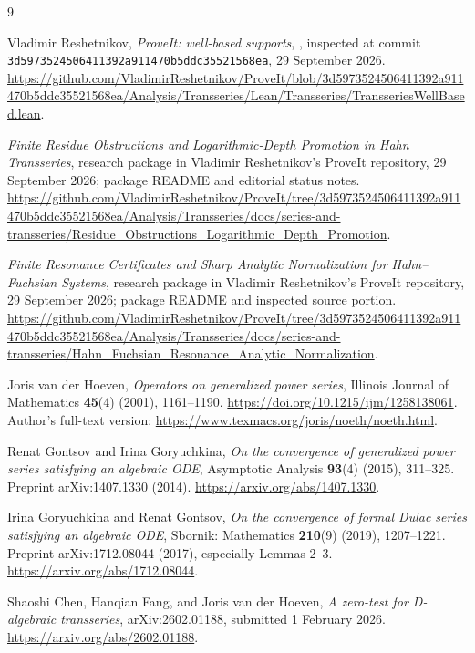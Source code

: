 \documentclass[11pt,a4paper]{article}
\numberwithin{equation}{section}
\theoremstyle{definition}
\theoremstyle{remark}
\newcommand{\snap}{\texttt{3d5973524506411392a911470b5ddc35521568ea}}
\begin{document}
\clearpage
\begin{thebibliography}{9}
\raggedright

Vladimir Reshetnikov, \emph{ProveIt: well-based supports},
,
inspected at commit \snap, 29 September 2026.
\url{https://github.com/VladimirReshetnikov/ProveIt/blob/3d5973524506411392a911470b5ddc35521568ea/Analysis/Transseries/Lean/Transseries/TransseriesWellBased.lean}.

\emph{Finite Residue Obstructions and Logarithmic-Depth Promotion in Hahn
Transseries}, research package in Vladimir Reshetnikov's ProveIt
repository, 29 September 2026; package README and editorial status notes.
\url{https://github.com/VladimirReshetnikov/ProveIt/tree/3d5973524506411392a911470b5ddc35521568ea/Analysis/Transseries/docs/series-and-transseries/Residue_Obstructions_Logarithmic_Depth_Promotion}.

\emph{Finite Resonance Certificates and Sharp Analytic Normalization for
Hahn--Fuchsian Systems}, research package in Vladimir Reshetnikov's
ProveIt repository, 29 September 2026; package README and inspected
source portion.
\url{https://github.com/VladimirReshetnikov/ProveIt/tree/3d5973524506411392a911470b5ddc35521568ea/Analysis/Transseries/docs/series-and-transseries/Hahn_Fuchsian_Resonance_Analytic_Normalization}.

Joris van der Hoeven, \emph{Operators on generalized power series},
Illinois Journal of Mathematics \textbf{45}(4) (2001), 1161--1190.
\url{https://doi.org/10.1215/ijm/1258138061}.
Author's full-text version:
\url{https://www.texmacs.org/joris/noeth/noeth.html}.

Renat Gontsov and Irina Goryuchkina,
\emph{On the convergence of generalized power series satisfying an
algebraic ODE}, Asymptotic Analysis \textbf{93}(4) (2015), 311--325.
Preprint arXiv:1407.1330 (2014).
\url{https://arxiv.org/abs/1407.1330}.

Irina Goryuchkina and Renat Gontsov,
\emph{On the convergence of formal Dulac series satisfying an algebraic
ODE}, Sbornik: Mathematics \textbf{210}(9) (2019), 1207--1221.
Preprint arXiv:1712.08044 (2017), especially Lemmas 2--3.
\url{https://arxiv.org/abs/1712.08044}.

Shaoshi Chen, Hanqian Fang, and Joris van der Hoeven,
\emph{A zero-test for D-algebraic transseries},
arXiv:2602.01188, submitted 1 February 2026.
\url{https://arxiv.org/abs/2602.01188}.

\end{thebibliography}
\end{document}
